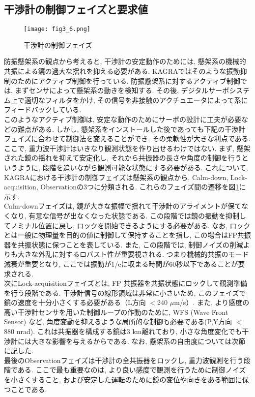 \subsection{干渉計の制御フェイズと要求値}
\begin{figure}[H]
\begin{center}
\texttt{[image: fig3\_6.png]}
\caption[干渉計の制御フェイズ]{干渉計の制御フェイズ}
\label{fig3.6}
\end{center}
\end{figure}
防振懸架系の観点から考えると, 干渉計の安定動作のためには, 懸架系の機械的共振による鏡の過大な揺れを抑える必要がある. KAGRAではそのような振動抑制のためにアクティブ制御を行っている. 防振懸架系に対するアクティブ制御では, まずセンサによって懸架系の動きを検知する. その後, デジタルサーボシステム上で適切なフィルタをかけ, その信号を非接触のアクチュエータによって系にフィードバックしている. \\
\quad このようなアクティブ制御は, 安定な動作のためにサーボの設計に工夫が必要などの難点がある. しかし, 懸架系をインストールした後であっても下記の干渉計フェイズに合わせて制御法を変えることができ, その柔軟性が大きな利点である. \\
\quad ここで, 重力波干渉計はいきなり観測状態を作り出せるわけではない. まず, 懸架された鏡の揺れを抑えて安定化し, それから共振器の長さや角度の制御を行うというように, 段階を追いながら観測可能な状態にする必要がある. これについて, KAGRAにおける干渉計の制御フェイズは懸架系の観点から, Calm-down, Lock-acquisition, Observationの3つに分類される. これらのフェイズ間の遷移を図\ref{fig3.6}に示す. \\
\quad Calm-downフェイズは, 鏡が大きな振幅で揺れて干渉計のアライメントが保てなくなり, 有意な信号が出なくなった状態である. この段階では鏡の振動を抑制してノミナル位置に戻し, ロックを開始できるようにする必要がある. なお, ロックとは一般に物理量を目的の値に制御して保持することを指し, この場合はFP共振器を共振状態に保つことを表している. また, この段階では, 制御ノイズの削減よりも大きな外乱に対するロバスト性が重要視される. つまり機械的共振のモード減衰が重要となり, ここでは振動が1/eに収まる時間が60秒以下であることが要求される. \\
\quad 次にLock-acquisitionフェイズとは, FP 共振器を共振状態にロックして観測準備を行う段階である. 干渉計信号の線形領域は非常に小さいため, このフェイズで鏡の速度を十分小さくする必要がある（L方向 $<$240 $\mu$m/s）. また, より感度の高い干渉計センサを用いた制御ループの作動のために, WFS (Wave Front Sensor) \cite{35}など, 角度変動を抑えるような局所的な制御も必要である(P,Y方向 $<$880 nrad). これは共振器を構成する鏡は3 km離れており, 小さな角度変化でも干渉計には大きな影響を与えるからである. なお, 懸架系の自由度については次節に記した. \\
\quad 最後のObservationフェイズは干渉計の全共振器をロックし, 重力波観測を行う段階である. ここで最も重要なのは, より良い感度で観測を行うために制御ノイズを小さくすること, および安定した運転のために鏡の変位や向きをある範囲に保つことである. 

